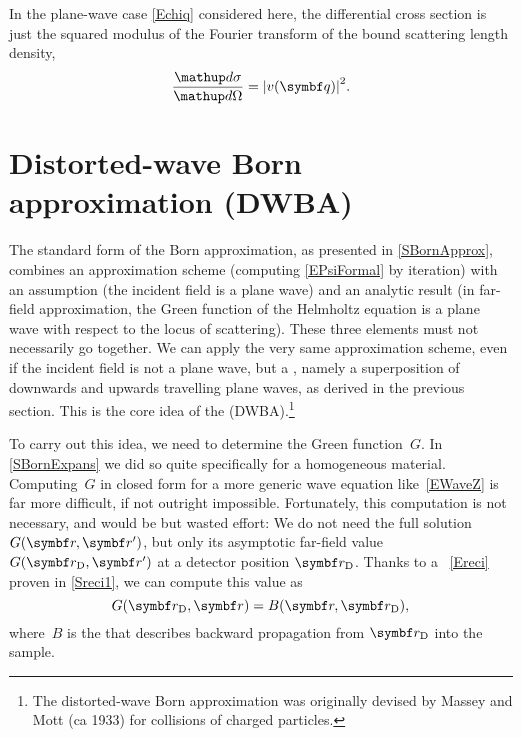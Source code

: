 In the plane-wave case \cref{Echiq} considered here,
the differential cross section is just the squared modulus
of the Fourier transform of the bound scattering length density,
%
\begin{equation}\label{Ecross1}
  \frac{\d\sigma}{\d\Omega}
  = {\left| v(\q) \right|}^2.
\end{equation}

\section{Distorted-wave Born approximation (DWBA)}\label{SDWBA}

%
%

The standard form of the Born approximation,
as presented in \cref{SBornApprox},
combines an approximation scheme
(computing \cref{EPsiFormal} by iteration)
with an assumption (the incident field is a plane wave)
and an analytic result
(in far-field approximation,
the Green function of the Helmholtz equation is a plane wave
with respect to the locus of scattering).
These three elements must not necessarily go together.
We can apply the very same approximation scheme,
even if the incident field is not a plane wave,
but a ,
namely a superposition of downwards and upwards travelling plane waves,
as derived in the previous section.
This is the core idea
of the  (DWBA).\footnote
{The distorted-wave Born approximation
was originally devised by Massey and Mott (ca 1933)
for collisions of charged particles.}

To carry out this idea, we need to determine the Green function~$G$.
%
In \cref{SBornExpans} we did so quite specifically
for a homogeneous material.
Computing~$G$ in closed form for a more generic wave equation
like~\cref{EWaveZ} is far more difficult,
if not outright impossible.
Fortunately, this computation is not necessary,
and would be but wasted effort:
We do not need the full solution~$G(\r,\r')$,
but only its asymptotic far-field value $G(\rD,\r')$
at a detector position $\rD$.
%
Thanks to a ~\cref{Ereci}
%
proven in \cref{Sreci1},
we can compute this value
as
\begin{equation}\label{EreciDup}
  G(\rD,\r) = B(\r,\rD),
\end{equation}
%
where~$B$ is the 
that describes backward propagation from $\rD$ into the sample.

